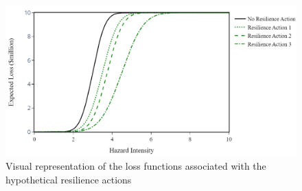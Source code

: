     \begin{figure}[H]
        \centering
        \includegraphics[scale=0.5]{Figures/Images/Hazard Scenario Selection/loss_functions.png}
        \caption{Visual representation of the loss functions associated with the hypothetical resilience actions}
        \label{fig:loss_functions}
    \end{figure}